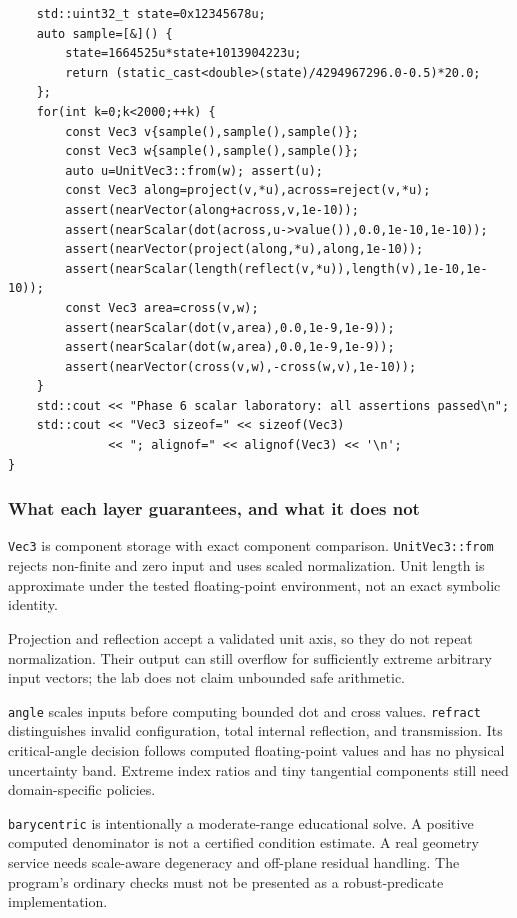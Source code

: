 \begin{verbatim}
    std::uint32_t state=0x12345678u;
    auto sample=[&]() {
        state=1664525u*state+1013904223u;
        return (static_cast<double>(state)/4294967296.0-0.5)*20.0;
    };
    for(int k=0;k<2000;++k) {
        const Vec3 v{sample(),sample(),sample()};
        const Vec3 w{sample(),sample(),sample()};
        auto u=UnitVec3::from(w); assert(u);
        const Vec3 along=project(v,*u),across=reject(v,*u);
        assert(nearVector(along+across,v,1e-10));
        assert(nearScalar(dot(across,u->value()),0.0,1e-10,1e-10));
        assert(nearVector(project(along,*u),along,1e-10));
        assert(nearScalar(length(reflect(v,*u)),length(v),1e-10,1e-10));
        const Vec3 area=cross(v,w);
        assert(nearScalar(dot(v,area),0.0,1e-9,1e-9));
        assert(nearScalar(dot(w,area),0.0,1e-9,1e-9));
        assert(nearVector(cross(v,w),-cross(w,v),1e-10));
    }
    std::cout << "Phase 6 scalar laboratory: all assertions passed\n";
    std::cout << "Vec3 sizeof=" << sizeof(Vec3)
              << "; alignof=" << alignof(Vec3) << '\n';
}
\end{verbatim}

\subsubsection{What each layer guarantees, and what it does not}\label{what-each-layer-guarantees-and-what-it-does-not}

\texttt{Vec3} is component storage with exact component comparison. \texttt{UnitVec3::from} rejects non-finite and zero input and uses scaled normalization. Unit length is approximate under the tested floating-point environment, not an exact symbolic identity.

Projection and reflection accept a validated unit axis, so they do not repeat normalization. Their output can still overflow for sufficiently extreme arbitrary input vectors; the lab does not claim unbounded safe arithmetic.

\texttt{angle} scales inputs before computing bounded dot and cross values. \texttt{refract} distinguishes invalid configuration, total internal reflection, and transmission. Its critical-angle decision follows computed floating-point values and has no physical uncertainty band. Extreme index ratios and tiny tangential components still need domain-specific policies.

\texttt{barycentric} is intentionally a moderate-range educational solve. A positive computed denominator is not a certified condition estimate. A real geometry service needs scale-aware degeneracy and off-plane residual handling. The program's ordinary checks must not be presented as a robust-predicate implementation.

